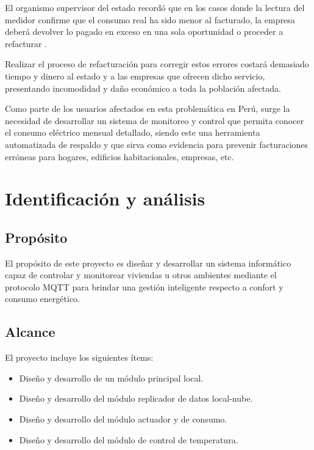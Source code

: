 El organismo supervisor del estado recordó que en los casos donde la lectura del medidor confirme que el consumo real ha sido menor al facturado, la empresa deberá devolver lo pagado en exceso en una sola oportunidad o proceder a refacturar \citep{WEBSITE:2}.

Realizar el proceso de refacturación para corregir estos errores costará demasiado tiempo y dinero al estado y a las empresas que ofrecen dicho servicio, presentando incomodidad y daño económico a toda la población afectada. 

Como parte de los usuarios afectados en esta problemática en Perú, surge la necesidad de desarrollar un sistema de monitoreo y control que permita conocer el consumo eléctrico mensual detallado, siendo este una herramienta automatizada de respaldo y que sirva como evidencia para prevenir facturaciones erróneas para hogares, edificios habitacionales, empresas, etc.


\section{Identificación y análisis}



\subsection{Propósito}

El propósito de este proyecto es diseñar y desarrollar un sistema informático capaz de controlar y monitorear viviendas u otros ambientes mediante el protocolo MQTT para brindar una gestión inteligente respecto a confort y consumo energético.

\subsection{Alcance}

El proyecto incluye los siguientes ítems:
\begin{itemize}
\item Diseño y desarrollo de un módulo principal local.
\item Diseño y desarrollo del módulo replicador de datos local-nube.
\item Diseño y desarrollo del módulo actuador y de consumo.
\item Diseño y desarrollo del módulo de control de temperatura.
\end{itemize}

